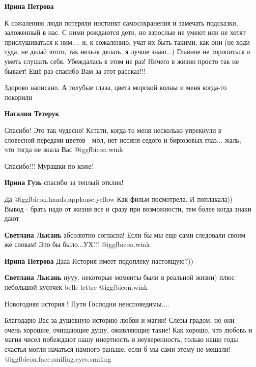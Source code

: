\begin{itemize}
\begin{itemize}
\textbf{Ирина Петрова} 

К сожалению люди потеряли инстинкт самосохранения и замечать
подсказки, заложенный в нас. С ними рождаются дети, но взрослые не умеют или не
хотят прислушиваться к ним.... и, к сожалению, учат их быть такими, как они (не
ходи туда, не делай этого, так нельзя делать, я лучше знаю...) Главное не
торопиться и уметь слушать себя. Убеждалась в этом не раз! Ничего в жизни
просто так не бывает! Ещё раз спасибо Вам за этот рассказ!!!

\end{itemize} %

Здорово написано. А голубые глаза, цвета морской волны и меня когда-то покорили

\begin{itemize} %
\textbf{Наталия Тетерук} 

Спасибо! Это так чудесно! Кстати, когда-то меня несколько упрекнули в словесной
передачи цветов - мол, нет иссиня-седого и бирюзовых глаз... жаль, что тогда не
знала Вас @igg{fbicon.wink} 

\end{itemize} %

Спасибо!!! Мурашки по коже!

\textbf{Ирина Гузь} спасибо за теплый отклик!

Да  @igg{fbicon.hands.applause.yellow} 
Как фильм посмотрела. И поплакала))
Вывод - брать надо от жизни все и сразу при возможности, тем более когда знаки дают

\begin{itemize} %
\textbf{Светлана Лысань} абсолютно согласна! Если бы мы еще сами следовали своим же словам! Это бы было...УХ!!! @igg{fbicon.wink} 

\textbf{Ирина Петрова}
Дааа
История имеет подоплеку настоящую?))

\textbf{Светлана Лысань} нууу, некоторые моменты были в реальной жизни) плюс небольшой кусочек belle lettre @igg{fbicon.wink} 
\end{itemize} %

Новогодняя история ! Пути Господни неисповедимы....


Благодарю Вас за душевную историю любви и магии! Слёзы градом, но они очень
хорошие, очищающие душу, оживляющие такие! Как хорошо, что любовь и магия чисел
побеждают нашу инертность и неуверенность, только наши годы счастья могли
начаться намного раньше, если б мы сами этому не мешали! @igg{fbicon.face.smiling.eyes.smiling} 


\end{itemize}
